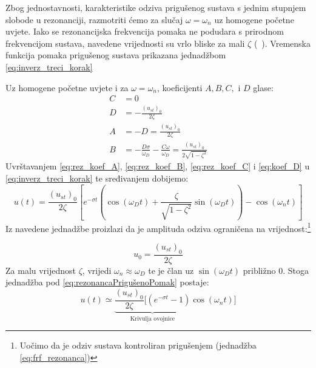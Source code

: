 Zbog jednostavnosti, karakteristike odziva prigušenog sustava s jednim stupnjem
slobode u rezonanciji, razmotriti ćemo za slučaj $\omega = \omega_n$ uz
homogene početne uvjete. Iako se rezonancijska frekvencija pomaka ne podudara s 
prirodnom frekvencijom sustava, navedene vrijednosti su vrlo bliske za mali $\zeta$ (~\cite{chopra2011}). 
Vremenska funkcija pomaka prigušenog sustava prikazana jednadžbom \eqref{eq:inverz_treci_korak}

Uz homogene početne uvjete i za $\omega=\omega_n$, koeficijenti $A,B,C,\text{ i }D$
glase:
\begin{align}
    C &= 0 \label{eq:rez_koef_C}\\
    D &= -\frac{(u_{st})_0}{2\zeta}\label{eq:rez_koef_D}\\
    A &= -D = \frac{(u_{st})_0}{2\zeta}\label{eq:rez_koef_A}\\
    B &= -\frac{D\sigma}{\omega_D}-\frac{C\omega}{\omega_D}=
          \frac{(u_{st})_0}{2\sqrt{1-\zeta^2}}\label{eq:rez_koef_B}
\end{align}
Uvrštavanjem \eqref{eq:rez_koef_A}, \eqref{eq:rez_koef_B}, \eqref{eq:rez_koef_C} i \eqref{eq:koef_D}
u \eqref{eq:inverz_treci_korak} te sređivanjem dobijemo:
\begin{equation}\label{eq:rezonancaPrigušenoPomak}
    u(t)=\frac{(u_{st})_0}{2\zeta}\left[
        e^{-\sigma t} \left(
            \cos(\omega_D t)+\frac{\zeta}{\sqrt{1-\zeta^2}}\sin(\omega_D t)
            \right)
        -\cos(\omega_n t)
        \right]
\end{equation}
Iz navedene jednadžbe proizlazi da je amplituda odziva ograničena na
vrijednost:\footnote{Uočimo da je odziv sustava kontroliran prigušenjem (jednadžba \eqref{eq:frf_rezonanca})}

\begin{equation}\label{eq:rezonanca_amplituda}
    u_0=\frac{(u_{st})_0}{2\zeta}
\end{equation}
Za malu vrijednost $\zeta$, vrijedi $\omega_n\approx\omega_D$ te je član
uz $\sin(\omega_Dt) \text{ približno } 0$. Stoga jednadžba pod \eqref{eq:rezonancaPrigušenoPomak}
postaje:
\begin{equation}\label{eq:rezonancaOdzivAproksimacija}
    u(t)\simeq\underbrace{
        \frac{(u_{st})_0}{2\zeta}[(e^{-\sigma t}-1)
        }_{\text{Krivulja ovojnice}}
        \cos(\omega_nt)]
\end{equation}

